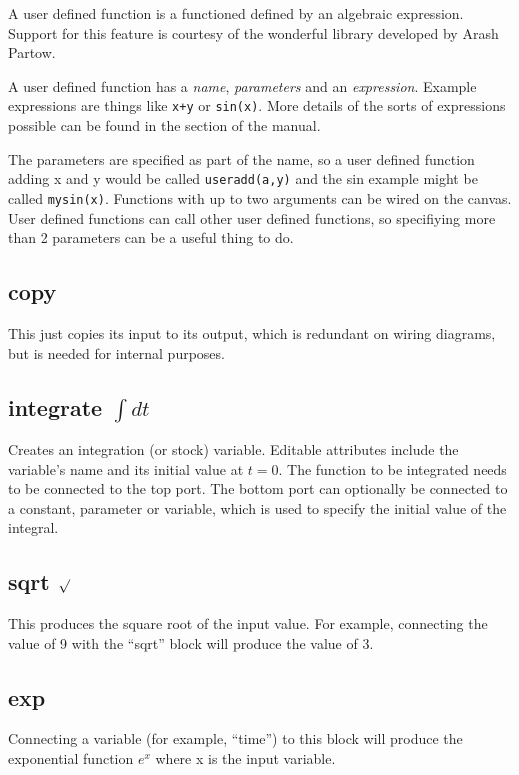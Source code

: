 A user defined function is a functioned defined by an algebraic
expression. Support for this feature is courtesy of the wonderful
library developed by Arash Partow.

A user defined function has a {\em name}, {\em parameters} and an {\em
  expression}. Example expressions are things like \verb'x+y' or
\verb'sin(x)'. More details of the sorts of expressions possible can
be found in the  section of
the manual.

The parameters are specified as part of the name, so a user defined
function adding x and y would be called \verb'useradd(a,y)' and the
sin example might be called \verb'mysin(x)'. Functions with up to two
arguments can be wired on the canvas. User defined functions can call
other user defined functions, so specifiying more than 2 parameters
can be a useful thing to do.

\subsection{copy}\label{Operation:copy} This just copies its input to its output,
which is redundant on wiring diagrams, but is needed for internal
purposes.

\subsection{integrate $\int dt$}\label{IntOp}  Creates an integration (or stock)
variable. Editable attributes include the variable's name and its
initial value at $t=0$. The function to be integrated needs to be
connected to the top port. The bottom port can optionally be connected
to a constant, parameter or variable, which is used to specify the
initial value of the integral.

\subsection{sqrt $\surd$}\label{Operation:sqrt} This produces the square root of 
the input value. For example, connecting the value of 9 with the
``sqrt'' block will produce the value of 3.

\subsection{exp}\label{Operation:exp} Connecting a variable (for example, ``time'')
to this block will produce the exponential function $e^{x}$ where x is
the input variable.

